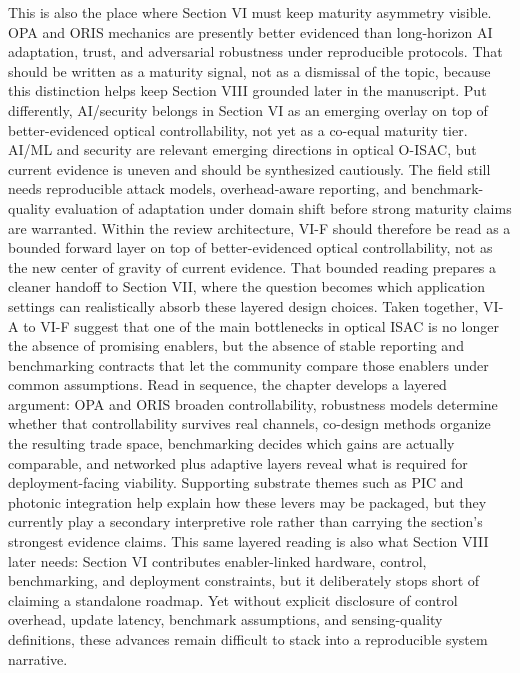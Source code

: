 {}This is also the place where Section VI must keep maturity asymmetry visible. OPA and ORIS mechanics are presently better evidenced than long-horizon AI adaptation, trust, and adversarial robustness under reproducible protocols. That should be written as a maturity signal, not as a dismissal of the topic, because this distinction helps keep Section VIII grounded later in the manuscript. Put differently, AI/security belongs in Section VI as an emerging overlay on top of better-evidenced optical controllability, not yet as a co-equal maturity tier.\markdownRendererParagraphSeparator
{} AI/ML and security are relevant emerging directions in optical O-ISAC, but current evidence is uneven and should be synthesized cautiously. The field still needs reproducible attack models, overhead-aware reporting, and benchmark-quality evaluation of adaptation under domain shift before strong maturity claims are warranted. Within the review architecture, VI-F should therefore be read as a bounded forward layer on top of better-evidenced optical controllability, not as the new center of gravity of current evidence. That bounded reading prepares a cleaner handoff to Section VII, where the question becomes which application settings can realistically absorb these layered design choices.\markdownRendererInterblockSeparator
{}
\markdownRendererSectionEnd \markdownRendererSectionBegin
{}\markdownRendererInterblockSeparator
{}Taken together, VI-A to VI-F suggest that one of the main bottlenecks in optical ISAC is no longer the absence of promising enablers, but the absence of stable reporting and benchmarking contracts that let the community compare those enablers under common assumptions. Read in sequence, the chapter develops a layered argument: OPA and ORIS broaden controllability, robustness models determine whether that controllability survives real channels, co-design methods organize the resulting trade space, benchmarking decides which gains are actually comparable, and networked plus adaptive layers reveal what is required for deployment-facing viability. Supporting substrate themes such as PIC and photonic integration help explain how these levers may be packaged, but they currently play a secondary interpretive role rather than carrying the section's strongest evidence claims. This same layered reading is also what Section VIII later needs: Section VI contributes enabler-linked hardware, control, benchmarking, and deployment constraints, but it deliberately stops short of claiming a standalone roadmap. Yet without explicit disclosure of control overhead, update latency, benchmark assumptions, and sensing-quality definitions, these advances remain difficult to stack into a reproducible system narrative.\markdownRendererParagraphSeparator
